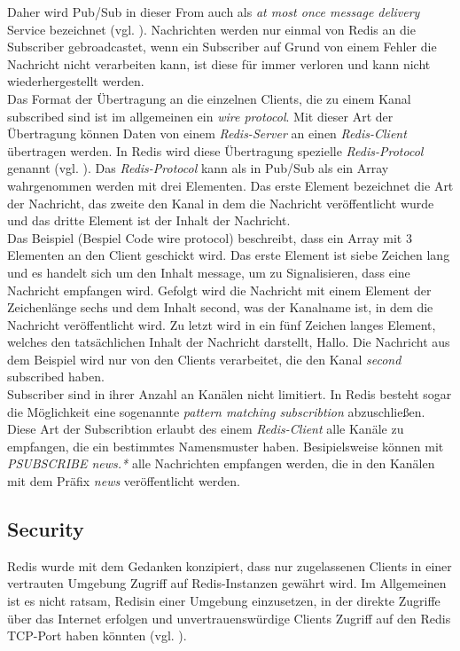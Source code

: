 Daher wird \acs{Pub/Sub} in dieser From auch als \textit{at most once message delivery} Service bezeichnet (vgl. \cite{Redis-PubSub}). Nachrichten werden nur einmal von \acs{Redis} an die Subscriber gebroadcastet, wenn ein Subscriber auf Grund von einem Fehler die Nachricht nicht verarbeiten kann, ist diese für immer verloren und kann nicht wiederhergestellt werden. 
\\
Das Format der Übertragung an die einzelnen Clients, die zu einem Kanal subscribed sind ist im allgemeinen ein \textit{wire protocol}. Mit dieser Art der Übertragung können Daten von einem \textit{Redis-Server} an einen \textit{Redis-Client} übertragen werden.
In \acs{Redis} wird diese Übertragung spezielle \textit{Redis-Protocol} genannt (vgl. \cite{Redis-PubSub}).
Das \textit{Redis-Protocol} kann als in \acs{Pub/Sub} als ein Array wahrgenommen werden mit drei Elementen. Das erste Element bezeichnet die Art der Nachricht, das zweite den Kanal in dem die Nachricht veröffentlicht wurde und das dritte Element ist der Inhalt der Nachricht. 
\\
Das Beispiel (Bespiel Code wire protocol) beschreibt, dass ein Array mit 3 Elementen an den Client geschickt wird. Das erste Element ist siebe Zeichen lang und es handelt sich um den Inhalt message, um zu Signalisieren, dass eine Nachricht empfangen wird. Gefolgt wird die Nachricht mit einem Element der Zeichenlänge sechs und dem Inhalt second, was der Kanalname ist, in dem die Nachricht veröffentlicht wird. Zu letzt wird in ein fünf Zeichen langes Element, welches den tatsächlichen Inhalt der Nachricht darstellt, \glqq Hallo\grqq.
Die Nachricht aus dem Beispiel wird nur von den Clients verarbeitet, die den Kanal \textit{second} subscribed haben.
\\
Subscriber sind in ihrer Anzahl an Kanälen nicht limitiert. In \acs{Redis} besteht sogar die Möglichkeit eine sogenannte \textit{pattern matching subscribtion} abzuschließen. Diese Art der Subscribtion erlaubt des einem \textit{Redis-Client} alle Kanäle zu empfangen, die ein bestimmtes Namensmuster haben. Besipielsweise können mit \textit{PSUBSCRIBE news.*} alle Nachrichten empfangen werden, die in den Kanälen mit dem Präfix \textit{news} veröffentlicht werden.


\subsection{Security}
\acs{Redis} wurde mit dem Gedanken konzipiert, dass nur zugelassenen Clients in einer vertrauten Umgebung  Zugriff auf \acs{Redis}-Instanzen gewährt wird. 
Im Allgemeinen ist es nicht ratsam, \acs{Redis}in einer Umgebung einzusetzen, in der direkte Zugriffe über das Internet erfolgen und unvertrauenswürdige Clients Zugriff auf den \acs{Redis} TCP-Port haben könnten (vgl. \cite{Redis-Security}).

